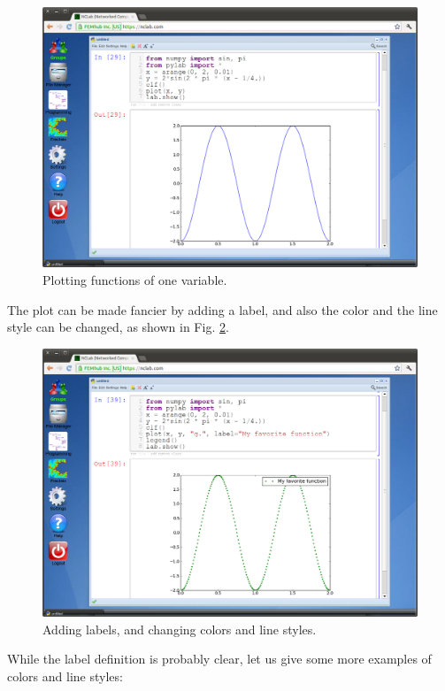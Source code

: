 \documentclass[article,A4,12pt]{llncs}
\begin{document}
\begin{figure}[!ht]
\begin{center}
\includegraphics[width=\textwidth]{img/plot.png}
\end{center}
\vspace{-2mm}
\caption{Plotting functions of one variable.}
\label{fig:plot}
\end{figure}

The plot can be made fancier by adding a label, and also the color 
and the line style can be changed, as shown in Fig. \ref{fig:plot2}.

\begin{figure}[!ht]
\begin{center}
\includegraphics[width=\textwidth]{img/plot2.png}
\end{center}
\vspace{-2mm}
\caption{Adding labels, and changing colors and line styles.}
\label{fig:plot2}
\end{figure}
\noindent
While the label definition is probably clear, let us give some more examples 
of colors and line styles:
\end{document}
